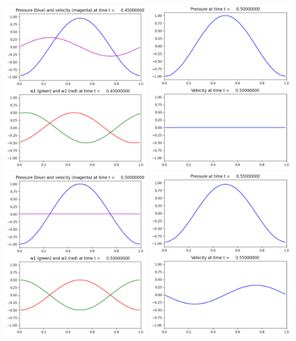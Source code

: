 \documentclass[11pt]{article}
\begin{document}
\includegraphics[width=0.475\textwidth]{frame0009fig2.png}
\vskip 10pt 
\includegraphics[width=0.475\textwidth]{frame0010fig1.png}
\includegraphics[width=0.475\textwidth]{frame0010fig2.png}
\vskip 10pt 
\includegraphics[width=0.475\textwidth]{frame0011fig1.png}
\end{document}
